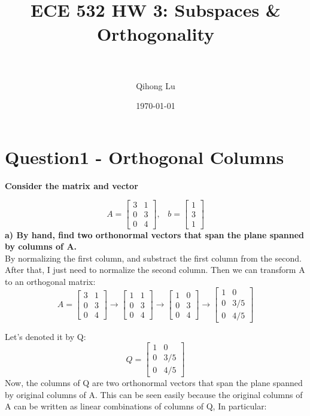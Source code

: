 \documentclass[paper=a4, fontsize=11pt]{scrartcl} %
\title{	
\normalfont \normalsize 
\horrule{0.5pt} \\[0.4cm] %
\huge ECE 532 HW 3: Subspaces \& Orthogonality\\ %
\horrule{2pt} \\[0.5cm] %
}
\author{Qihong Lu} %
\date{\normalsize\today} %
\numberwithin{equation}{section} %
\numberwithin{figure}{section} %
\numberwithin{table}{section} %
\begin{document}
\maketitle %


\section*{Question1 - Orthogonal Columns}
\textbf{Consider the matrix and vector}

$$
A = 
\begin{bmatrix}
3 & 1 \\
0 & 3 \\
0 & 4 
\end{bmatrix},
\;\;\;
b = 
\begin{bmatrix}
1 \\
3 \\
1 
\end{bmatrix}
$$
\textbf{a) By hand, find two orthonormal vectors that span the plane spanned by columns of A.}\\

By normalizing the first column, and substract the first column from the second. After that, I just need to normalize the second column. Then we can transform A to an orthogonal matrix: 
$$
A = 
\begin{bmatrix}
3 & 1 \\
0 & 3 \\
0 & 4 
\end{bmatrix}
\rightarrow
\begin{bmatrix}
1 & 1 \\
0 & 3 \\
0 & 4 
\end{bmatrix}
\rightarrow
\begin{bmatrix}
1 & 0 \\
0 & 3 \\
0 & 4 
\end{bmatrix}
\rightarrow
\begin{bmatrix}
1 & 0 \\
0 & 3/5 \\
0 & 4/5 
\end{bmatrix}
$$

Let's denoted it by Q:
$$
Q
=
\begin{bmatrix}
1 & 0 \\
0 & 3/5 \\
0 & 4/5 
\end{bmatrix}
$$
Now, the columns of Q are two orthonormal vectors that span the plane spanned by original columns of A. This can be seen easily because the original columns of A can be written as linear combinations of columns of Q, In particular: 
\end{document}
